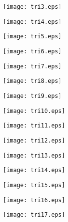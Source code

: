 \documentclass{beamer}
\theoremstyle{theorem}
\theoremstyle{definition}
\begin{document}
\begin{frame}
\texttt{[image: tri3.eps]}
\end{frame}

\begin{frame}
\texttt{[image: tri4.eps]}
\end{frame}

\begin{frame}
\texttt{[image: tri5.eps]}
\end{frame}

\begin{frame}
\texttt{[image: tri6.eps]}
\end{frame}

\begin{frame}
\texttt{[image: tri7.eps]}
\end{frame}

\begin{frame}
\texttt{[image: tri8.eps]}
\end{frame}

\begin{frame}
\texttt{[image: tri9.eps]}
\end{frame}

\begin{frame}
\texttt{[image: tri10.eps]}
\end{frame}

\begin{frame}
\texttt{[image: tri11.eps]}
\end{frame}

\begin{frame}
\texttt{[image: tri12.eps]}
\end{frame}

\begin{frame}
\texttt{[image: tri13.eps]}
\end{frame}

\begin{frame}
\texttt{[image: tri14.eps]}
\end{frame}

\begin{frame}
\texttt{[image: tri15.eps]}
\end{frame}

\begin{frame}
\texttt{[image: tri16.eps]}
\end{frame}

\begin{frame}
\texttt{[image: tri17.eps]}
\end{frame}
\end{document}
